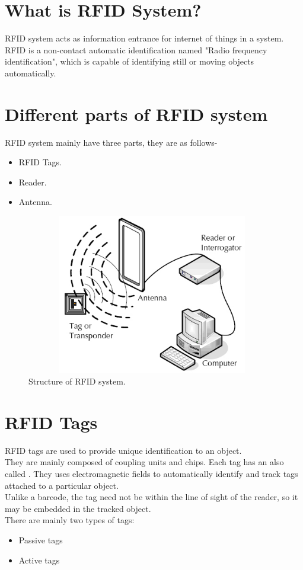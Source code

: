 \documentclass[12pt, a4paper]{report}
\begin{document}
\section{What is RFID System?}
RFID system acts as information entrance for internet of things in a system. RFID is a non-contact automatic identification named "Radio frequency identification", which is capable of identifying still or moving objects automatically.

\section{Different parts of RFID system}
RFID system mainly have three parts, they are as follows-\\
\begin{itemize}
    \item RFID Tags.
    \item Reader.
    \item Antenna.
\end{itemize}
\begin{figure}[h]
\centering
\includegraphics[width=11cm,height=7cm]{rfid}
\caption{Structure of RFID system.\cite{yan2009supply}}
\label{figure-6}
\end{figure}

\section{RFID Tags}
RFID tags are used to provide  unique identification to an object.\\
They are mainly composed of coupling units and chips. Each tag has an  also called .
They uses electromagnetic fields to automatically identify and track tags attached to a particular object.\\Unlike a barcode, the tag need not be within the line of sight of the reader, so it may be embedded in the tracked object.\\
There are mainly two types of tags:
\begin{itemize}
    \item Passive tags
    \item Active tags
\end{itemize}
\end{document}
